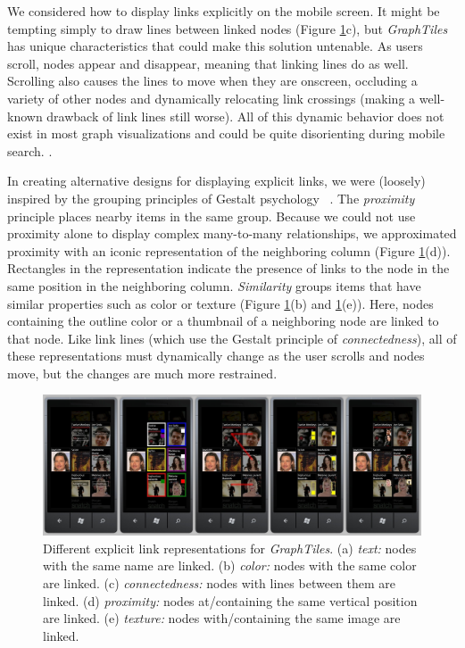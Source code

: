 We considered how to display links explicitly on the mobile screen. It might be tempting simply to draw lines between linked nodes (Figure \ref{fig:linkrep}c), but \textit{GraphTiles} has unique characteristics that could make this solution untenable. As users scroll, nodes appear and disappear, meaning that linking lines do as well. Scrolling also causes the lines to move when they are onscreen, occluding a variety of other nodes and dynamically relocating link crossings (making a well-known drawback of link lines still worse). All of this dynamic behavior does not exist in most graph visualizations and could be quite disorienting during mobile search. .

In creating alternative designs for displaying explicit links, we were (loosely) inspired by the grouping principles of Gestalt psychology ~\cite{RefWorks:562}. The \textit{proximity} principle places nearby items in the same group. Because we could not use proximity alone to display complex many-to-many relationships, we approximated proximity with an iconic representation of the neighboring column (Figure \ref{fig:linkrep}(d)). Rectangles in the representation indicate the presence of links to the node in the same position in the neighboring column. \textit{Similarity} groups items that have similar properties such as color or texture (Figure \ref{fig:linkrep}(b) and \ref{fig:linkrep}(e)). Here, nodes containing the outline color or a thumbnail of a neighboring node are linked to that node. Like link lines (which use the Gestalt principle of \textit{connectedness}), all of these representations must dynamically change as the user scrolls and nodes move, but the changes are much more restrained.

\begin{figure}[htb!]
\centering
\includegraphics[width=7in]{images/linkrep}
\caption{Different explicit link representations for \textit{GraphTiles}. (a) \emph{text:} nodes with the same name are linked. (b) \emph{color:} nodes with the same color are linked. (c) \emph{connectedness:} nodes with lines between them are linked. (d) \emph{proximity:} nodes at/containing the same vertical position are linked. (e) \emph{texture:} nodes with/containing the same image are linked.}
\label{fig:linkrep}
\end{figure}

